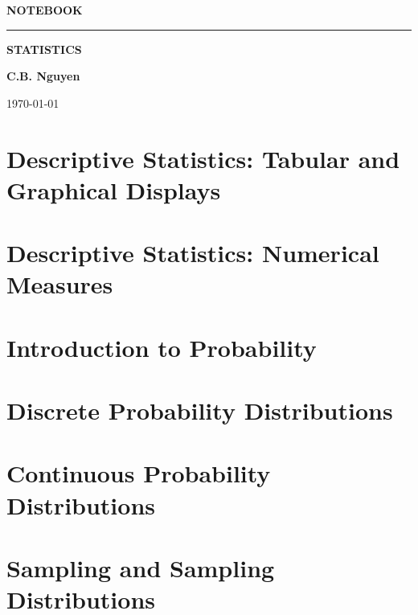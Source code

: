 \documentclass[12pt,a4paper]{report}
\begin{document}
 
    \begin{titlepage}
	\centering
    \phantom{}\par
	\vspace{3cm}
	{\LARGE\textbf{NOTEBOOK}\par}
	\vspace{1cm}
	\rule{5cm}{0.5pt}\par
	\vspace{1cm}
		{\LARGE\textbf{STATISTICS}\par}
	\vspace{1cm}
	\Large\textbf{C.B. Nguyen}\par		
	\vspace{1cm}
    \today
    \end{titlepage}


	\tableofcontents

	\thispagestyle{empty} %
	\mbox{}

\chapter{Descriptive Statistics: Tabular and Graphical Displays}

\chapter{Descriptive Statistics: Numerical Measures}

\chapter{Introduction to Probability}

\chapter{Discrete Probability Distributions}

\chapter{Continuous Probability Distributions}

\chapter{Sampling and Sampling Distributions}
\end{document}
